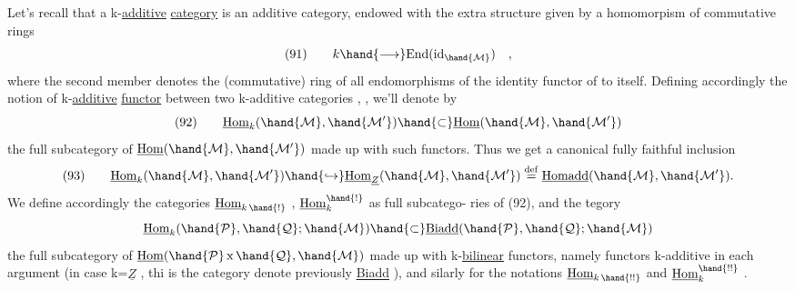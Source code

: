 
Let's recall that a k-\uline{additive} \uline{category}  is an additive category,
endowed with the extra structure given by a homomorpism of commutative
rings
\[ (91) \qquad k \hand{\longrightarrow} \mathrm{End}(\mathrm{id}_{\hand{\mathcal{M}}}) \quad , \]
where the second member denotes the (commutative) ring of all endomorphisms
of the identity functor of  to itself.  Defining accordingly the notion
of k-\uline{additive} \uline{functor} between two k-additive categories\xout{,}  , , we'll
denote by
\[ (92) \qquad \underline{\mathrm{Hom}}_k(\hand{\mathcal{M}},\hand{\mathcal{M}'}) \hand{\subset} \underline{\mathrm{Hom}}(\hand{\mathcal{M}},\hand{\mathcal{M}'}) \]
the full subcategory of $\underline{\mathrm{Hom}}(\hand{\mathcal{M}},\hand{\mathcal{M}'})$  made up with such functors.  Thus we
get a canonical fully faithful inclusion
\[ (93) \qquad \underline{\mathrm{Hom}}_k(\hand{\mathcal{M}},\hand{\mathcal{M}'}) \hand{\hookrightarrow} \underline{\mathrm{Hom}}_{\underline{Z}}(\hand{\mathcal{M}},\hand{\mathcal{M}'}) \overset{\mathrm{def}}{=} \underline{\mathrm{Homadd}}(\hand{\mathcal{M}},\hand{\mathcal{M}'}) . \]
We define accordingly the categories  $\underline{\mathrm{Hom}}_{k\,\hand{!}}$ ,  $\underline{\mathrm{Hom}}_k^{\hand{!}}$  as full subcatego-%
ries of (92),  and the  tegory
\[ \underline{\mathrm{Hom}}_k(\hand{\mathcal{P}},\hand{\mathcal{Q}};\hand{\mathcal{M}}) \hand{\subset} \underline{\mathrm{Biadd}}(\hand{\mathcal{P}},\hand{\mathcal{Q}};\hand{\mathcal{M}}) \]
 the full subcategory of  $\underline{\mathrm{Hom}}(\hand{\mathcal{P}}\,\mathrm{x}\,\hand{\mathcal{Q}},\hand{\mathcal{M}})$  made up with k-\uline{bilinear}
functors,  namely functors k-additive in each argument  (in case k=$\underline{Z}$ , thi
is the category denote previously  \uline{Biadd} ),  and silarly for the
notations  $\underline{\mathrm{Hom}}_{k\,\hand{!!}}$  and  $\underline{\mathrm{Hom}}_k^{\hand{!!}}$ .

